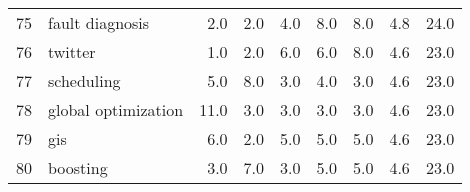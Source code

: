 \begin{tabular}{llrrrrrrr}
75 &                  fault diagnosis &   2.0 &   2.0 &    4.0 &    8.0 &    8.0 &    4.8 &   24.0 \\
76 &                          twitter &   1.0 &   2.0 &    6.0 &    6.0 &    8.0 &    4.6 &   23.0 \\
77 &                       scheduling &   5.0 &   8.0 &    3.0 &    4.0 &    3.0 &    4.6 &   23.0 \\
78 &              global optimization &  11.0 &   3.0 &    3.0 &    3.0 &    3.0 &    4.6 &   23.0 \\
79 &                              gis &   6.0 &   2.0 &    5.0 &    5.0 &    5.0 &    4.6 &   23.0 \\
80 &                         boosting &   3.0 &   7.0 &    3.0 &    5.0 &    5.0 &    4.6 &   23.0 \\
\bottomrule
\end{tabular}
